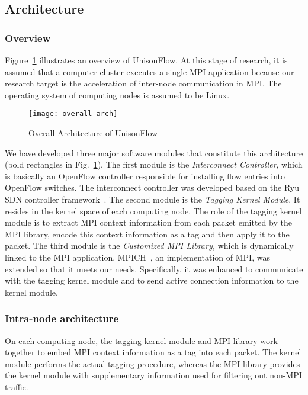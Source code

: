 \subsection{Architecture}

\subsubsection{Overview}

Figure~\ref{fig:overall-arch} illustrates an overview of UnisonFlow. At
this stage of research, it is assumed that a computer cluster executes a
single MPI application because our research target is the acceleration
of inter-node communication in MPI\@. The operating system of computing
nodes is assumed to be Linux.

\begin{figure}
    \centering
    \texttt{[image: overall-arch]}
    \caption{Overall Architecture of UnisonFlow}%
    \label{fig:overall-arch}
\end{figure}

We have developed three major software modules that constitute this
architecture (bold rectangles in Fig.~\ref{fig:overall-arch}). The first
module is the \emph{Interconnect Controller}, which is basically an
OpenFlow controller responsible for installing flow entries into
OpenFlow switches. The interconnect controller was developed based on
the Ryu SDN controller framework~\autocite{Ryu2014}. The second module
is the \emph{Tagging Kernel Module}. It resides in the kernel space of
each computing node. The role of the tagging kernel module is to extract
MPI context information from each packet emitted by the MPI library,
encode this context information as a tag and then apply it to the
packet. The third module is the \emph{Customized MPI Library,} which is
dynamically linked to the MPI application. MPICH~\autocite{Gropp2002},
an implementation of MPI, was extended so that it meets our needs.
Specifically, it was enhanced to communicate with the tagging kernel
module and to send active connection information to the kernel module.

\subsubsection{Intra-node architecture}

On each computing node, the tagging kernel module and MPI library work
together to embed MPI context information as a tag into each packet. The
kernel module performs the actual tagging procedure, whereas the MPI
library provides the kernel module with supplementary information used
for filtering out non-MPI traffic.

